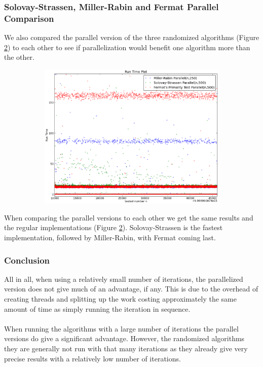 \documentclass[compressed,final,notitlepage,narroweqnarray,inline,twoside,]{ieee}
\begin{document}
\subsubsection{Solovay-Strassen, Miller-Rabin and Fermat Parallel Comparison}
We also compared the parallel version of the three randomized algorithms (Figure \ref{fig:randomized_p_comparison}) to each other to see if parallelization would benefit one algorithm more than the other.
\begin{figure}
        \centering
        \begin{subfigure}[b]{0.525\textwidth}
                \includegraphics[width=\textwidth]{../images/compare_parallel_runtime}
                \label{fig:gull}
        \end{subfigure}
        \vspace{-30pt}\caption{}\label{fig:randomized_p_comparison}
\end{figure}
When comparing the parallel versions to each other we get the same results and the regular implementations (Figure \ref{fig:randomized_p_comparison}). Solovay-Strassen is the fastest implementation, followed by Miller-Rabin, with Fermat coming last.
\subsubsection{Conclusion}
All in all, when using a relatively small number of iterations, the parallelized version does not give much of an advantage, if any. This is due to the overhead of creating threads and splitting up the work costing approximately the same amount of time as simply running the iteration in sequence.\\\\ When running the algorithms with a large number of iterations the parallel versions do give a significant advantage. However, the randomized algorithms they are generally not run with that many iterations as they already give very precise results with a relatively low number of iterations.
\end{document}
